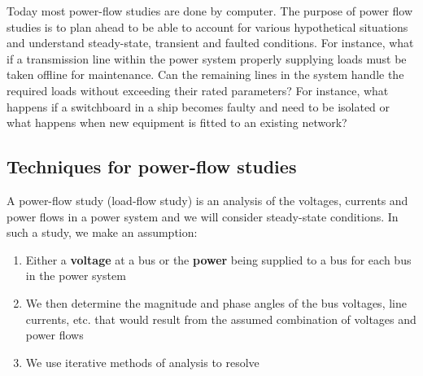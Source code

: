 Today most power-flow studies are done by computer. The purpose of power flow studies is to plan ahead to be able to account for various hypothetical situations and understand steady-state, transient and faulted conditions. For instance, what if a transmission line within the power system properly supplying loads must be taken offline for maintenance. Can the remaining lines in the system handle the required loads without exceeding their rated parameters? For instance, what happens if a switchboard in a ship becomes faulty and need to be isolated or what happens when new equipment is fitted to an existing network?
\subsection{Techniques for power-flow studies}
A power-flow study (load-flow study) is an analysis of the voltages, currents and power flows in a power system and we will consider steady-state conditions. In such a study, we make an assumption:
\begin{enumerate}
	\item Either a \textbf{voltage} at a bus or the \textbf{power} being supplied to a bus for each bus in the power system
	\item We then determine the magnitude and phase angles of the bus voltages, line currents, etc. that would result from the assumed combination of voltages and power flows
	\item We use iterative methods of analysis to resolve
\end{enumerate}
